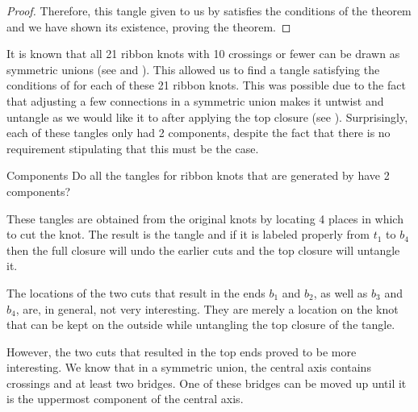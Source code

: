 \begin{paper}
\begin{proof}
Therefore, this tangle given to us by \lemTangles satisfies the conditions of
the theorem and we have shown its existence, proving the theorem.
\end{proof}


It is known that all 21 ribbon knots with 10 crossings or fewer can be drawn as
symmetric unions (see \cite{many} and \cite{one}).
This allowed us to find a tangle satisfying the conditions of \thmRibbon for
each of these 21 ribbon knots.
This was possible due to the fact that adjusting a few connections in a
symmetric union makes it untwist and untangle as we would like it to after
applying the top closure (see \figTop).
Surprisingly, each of these tangles only had 2 components, despite the fact that
there is no requirement stipulating that this must be the case.

\begin{paperqtn}{Components}
Do all the tangles for ribbon knots that are generated by \thmRibbon have 2
components?
\end{paperqtn}

These tangles are obtained from the original knots by locating 4 places in which
to cut the knot.
The result is the tangle and if it is labeled properly from $t_1$ to $b_4$ then
the full closure will undo the earlier cuts and the top closure will untangle it.

The locations of the two cuts that result in the ends $b_1$ and $b_2$, as well
as $b_3$ and $b_4$, are, in general, not very interesting.
They are merely a location on the knot that can be kept on the outside while
untangling the top closure of the tangle.

However, the two cuts that resulted in the top ends proved to be more
interesting.
We know that in a symmetric union, the central axis contains crossings and at
least two bridges.
One of these bridges can be moved up until it is the uppermost component of the
central axis.\newsavebox{\knotR}

\end{paper}

